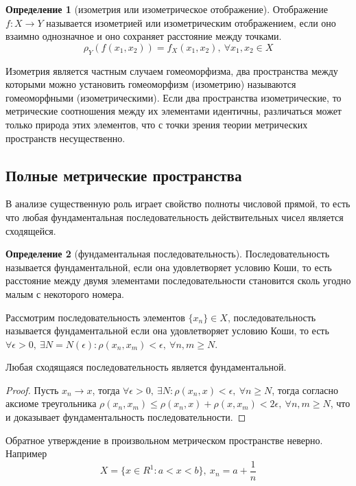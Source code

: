 \documentclass[14pt,a4paper]{extarticle}
\theoremstyle{definition}
\newtheorem{definition}{Определение}[section]
\theoremstyle{remark}
\renewcommand{\[}{\begin{dmath*}[compact]}
\renewcommand{\]}{\end{dmath*}}
\newcommand{\sep}{ , \ \allowbreak }
\newcommand\f[2]{\dfrac{#1}{#2}}
\begin{document}
\begin{definition}[изометрия или изометрическое отображение]
  Отображение $f: X \to Y$ называется изометрией или
  изометрическим отображением,
  если оно взаимно однозначное и оно сохраняет расстояние между точками.
  \[ \rho_Y(f(x_1,x_2))=f_X(x_1,x_2) \sep {\forall x_1,x_2\in X}\]
\end{definition}

Изометрия является частным случаем гомеоморфизма, два пространства между
которыми можно установить гомеоморфизм (изометрию) называются гомеоморфными
(изометрическими). Если два пространства изометрические, то метрические
соотношения между их элементами идентичны, различаться может только природа
этих элементов, что с точки зрения теории метрических пространств несущественно.

\subsection{Полные метрические пространства}

В анализе существенную роль играет свойство полноты числовой прямой, то есть
что любая фундаментальная последовательность действительных чисел является
сходящейся.

\begin{definition}[фундаментальная последовательность]
  Последовательность называется фундаментальной,
  если она удовлетворяет условию Коши,
  то есть расстояние между двумя элементами последовательности становится сколь
  угодно малым с некоторого номера.
\end{definition}

Рассмотрим последовательность элементов $\{x_n\} \in X$,
последовательность называется фундаментальной если она удовлетворяет
условию Коши, то есть $ \forall \epsilon > 0 \sep \exists N = N(\epsilon):
\rho(x_n, x_m) < \epsilon \sep \forall n, m \geq N $.

Любая сходящаяся последовательность является фундаментальной.

\begin{proof}
  Пусть $x_n \to x$, тогда
  $\forall \epsilon > 0 \sep \exists N: \rho(x_n, x) < \epsilon \sep
  \forall n \geq N$,
  тогда согласно аксиоме треугольника
  $\rho(x_n, x_m) \leq \rho(x_n, x)+\rho(x, x_m) < 2\epsilon \sep
  \forall n, m \geq N$,
  что и доказывает фундаментальность последовательности.
\end{proof}

Обратное утверждение в произвольном метрическом пространстве неверно.
Например \[ {X = \{x \in R^1: a < x < b\}} \sep {x_n = a + \f{1}{n}}\] %
\end{document}
